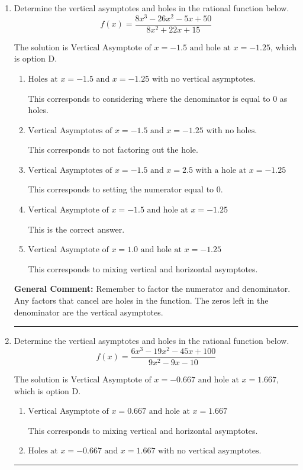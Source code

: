 \documentclass{extbook}[14pt]
\newcommand{\litem}[1]{\item #1

\rule{\textwidth}{0.4pt}}
\begin{document}
\begin{enumerate}\litem{
Determine the vertical asymptotes and holes in the rational function below.
\[ f(x) = \frac{8x^{3} -26 x^{2} -5 x + 50}{8x^{2} +22 x + 15} \]

The solution is \( \text{Vertical Asymptote of } x = -1.5 \text{ and hole at } x = -1.25 \), which is option D.\begin{enumerate}[label=\Alph*.]
\item \( \text{Holes at } x = -1.5 \text{ and } x = -1.25 \text{ with no vertical asymptotes.} \)

This corresponds to considering where the denominator is equal to 0 as holes.
\item \( \text{Vertical Asymptotes of } x = -1.5 \text{ and } x = -1.25 \text{ with no holes.} \)

This corresponds to not factoring out the hole.
\item \( \text{Vertical Asymptotes of } x = -1.5 \text{ and } x = 2.5 \text{ with a hole at } x = -1.25 \)

This corresponds to setting the numerator equal to 0.
\item \( \text{Vertical Asymptote of } x = -1.5 \text{ and hole at } x = -1.25 \)

This is the correct answer.
\item \( \text{Vertical Asymptote of } x = 1.0 \text{ and hole at } x = -1.25 \)

This corresponds to mixing vertical and horizontal asymptotes.
\end{enumerate}

\textbf{General Comment:} Remember to factor the numerator and denominator. Any factors that cancel are holes in the function. The zeros left in the denominator are the vertical asymptotes.
}
\litem{
Determine the vertical asymptotes and holes in the rational function below.
\[ f(x) = \frac{6x^{3} -19 x^{2} -45 x + 100}{9x^{2} -9 x -10} \]

The solution is \( \text{Vertical Asymptote of } x = -0.667 \text{ and hole at } x = 1.667 \), which is option D.\begin{enumerate}[label=\Alph*.]
\item \( \text{Vertical Asymptote of } x = 0.667 \text{ and hole at } x = 1.667 \)

This corresponds to mixing vertical and horizontal asymptotes.
\item \( \text{Holes at } x = -0.667 \text{ and } x = 1.667 \text{ with no vertical asymptotes.} \)


\end{enumerate}}
\end{enumerate}
\end{document}
